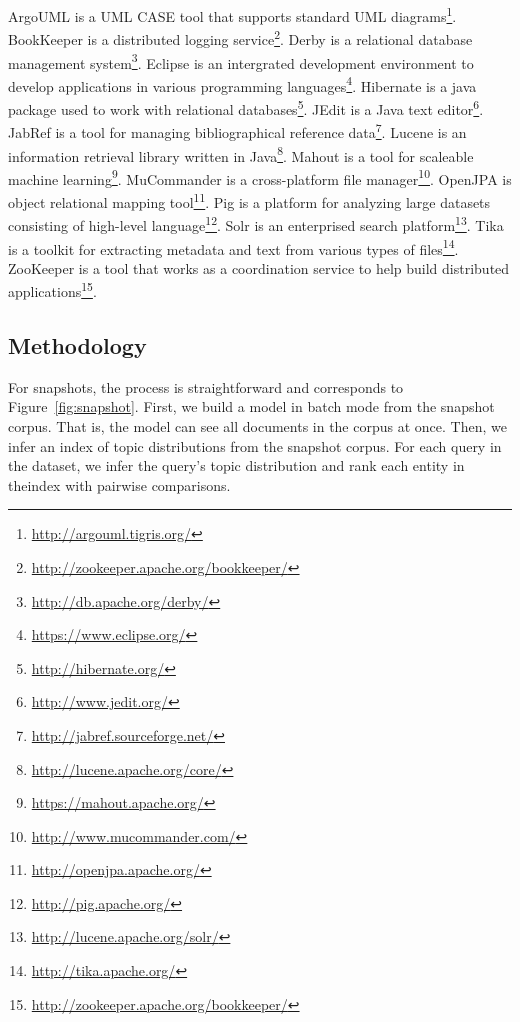 ArgoUML is a UML CASE tool that supports standard UML diagrams\footnote{\url{http://argouml.tigris.org/}}.
BookKeeper is a distributed logging service\footnote{\url{http://zookeeper.apache.org/bookkeeper/}}.
Derby is a relational database management system\footnote{\url{http://db.apache.org/derby/}}.
Eclipse is an intergrated development environment to develop applications in various programming languages\footnote{\url{https://www.eclipse.org/}}.
Hibernate is a java package used to work with relational databases\footnote{\url{http://hibernate.org/}}.
JEdit is a Java text editor\footnote{\url{http://www.jedit.org/}}.
JabRef is a tool for managing bibliographical reference data\footnote{\url{http://jabref.sourceforge.net/}}.
Lucene is an information retrieval library written in Java\footnote{\url{http://lucene.apache.org/core/}}.
Mahout is a tool for scaleable machine learning\footnote{\url{https://mahout.apache.org/}}.
MuCommander is a cross-platform file manager\footnote{\url{http://www.mucommander.com/}}.
OpenJPA is object relational mapping tool\footnote{\url{http://openjpa.apache.org/}}.
Pig is a platform for analyzing large datasets consisting of high-level language\footnote{\url{http://pig.apache.org/}}.
Solr is an enterprised search platform\footnote{\url{http://lucene.apache.org/solr/}}.
Tika is a toolkit for extracting metadata and text from various types of files\footnote{\url{http://tika.apache.org/}}.
ZooKeeper is a tool that works as a coordination service to help build distributed applications\footnote{\url{http://zookeeper.apache.org/bookkeeper/}}.



\subsection{Methodology}
\label{sec:methodology}

For snapshots, the process is straightforward and corresponds to
Figure~\ref{fig:snapshot}.  First, we build a model in batch mode from the
snapshot corpus.  That is, the model can see all documents in the corpus at
once.  Then, we infer an index of topic distributions from the snapshot corpus.
For each query in the dataset, we infer the query's topic distribution and rank
each entity in theindex with pairwise comparisons.

\begin{comment}
\begin{enumerate}
    \item Build model from the snapshot corpus in batch mode
    \item Infer a $\theta_{Snapshot}$ from the snapshot corpus
    \item Infer a $\theta_{Queries}$ from the query corpus
    \item Classify, or rank, the results from both $\theta$s
\end{enumerate}
\end{comment}


